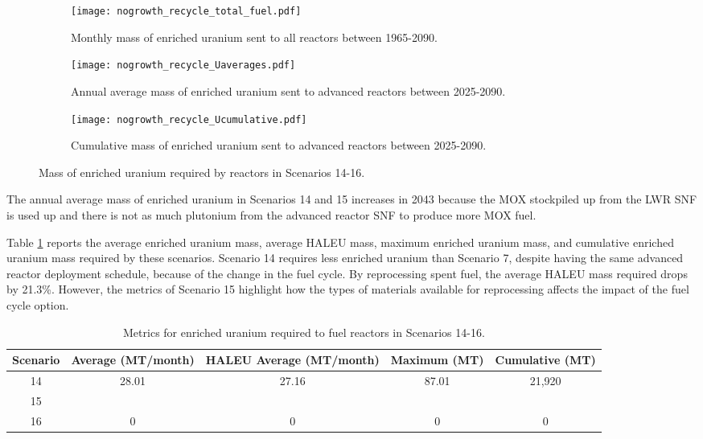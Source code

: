 \begin{figure}[h!]
    \centering
    \begin{subfigure}[b]{0.45\textwidth}
        \centering
        \texttt{[image: nogrowth\_recycle\_total\_fuel.pdf]}
        \caption{Monthly mass of enriched uranium sent to all reactors 
        between 1965-2090.}
        \label{fig:nogrowth_recycle_all_uranium}
    \end{subfigure}
    \hfill
    \begin{subfigure}[b]{0.45\textwidth}
        \centering
        \texttt{[image: nogrowth\_recycle\_Uaverages.pdf]}
        \caption{Annual average mass of enriched uranium sent to 
        advanced reactors between 2025-2090.}
        \label{fig:nogrowth_recycle_AR_uranium}
    \end{subfigure}
    \begin{subfigure}[b]{0.45\textwidth}
        \centering
        \texttt{[image: nogrowth\_recycle\_Ucumulative.pdf]}
        \caption{Cumulative mass of enriched 
        uranium sent to advanced reactors between 2025-2090.}
        \label{fig:nogrowth_recycle_uranium_cumulative}
    \end{subfigure}
       \caption{Mass of enriched uranium required by reactors
        in Scenarios 14-16.}
       \label{fig:nogrowth_recycle_uranium}
\end{figure}

The annual average mass of enriched uranium in Scenarios 14 and 15 increases 
in 2043 because the \gls{MOX} stockpiled up from the \gls{LWR} \gls{SNF} 
is used up and there is not as much plutonium from the advanced reactor 
\gls{SNF} to produce more \gls{MOX} fuel. 

Table \ref{tab:s14-16_uranium} reports the average enriched uranium mass, 
average \gls{HALEU} mass, maximum enriched uranium mass, and cumulative 
enriched uranium mass required by these scenarios. Scenario 14 requires 
less enriched uranium than Scenario 7, despite having the same 
advanced reactor deployment schedule, because of the change in the 
fuel cycle. By reprocessing spent fuel, the average \gls{HALEU} 
mass required drops by 21.3\%. However, the metrics of Scenario 15 
highlight how the types of materials available for reprocessing 
affects the impact of the fuel cycle option. 

\begin{table}[h!]
    \centering 
    \caption{Metrics for enriched uranium required to fuel reactors 
    in Scenarios 14-16.}
    \label{tab:s14-16_uranium}
    \begin{tabular}{c c c c c}
        \hline 
        Scenario & Average (MT/month) & HALEU Average (MT/month) 
        & Maximum (MT) & Cumulative (MT) \\
        \hline 
        14 & 28.01 & 27.16 & 87.01 & 21,920 \\
        15 & & & & \\
        16 & 0 & 0 & 0 & 0\\
        \hline
        
    \end{tabular}
\end{table}

